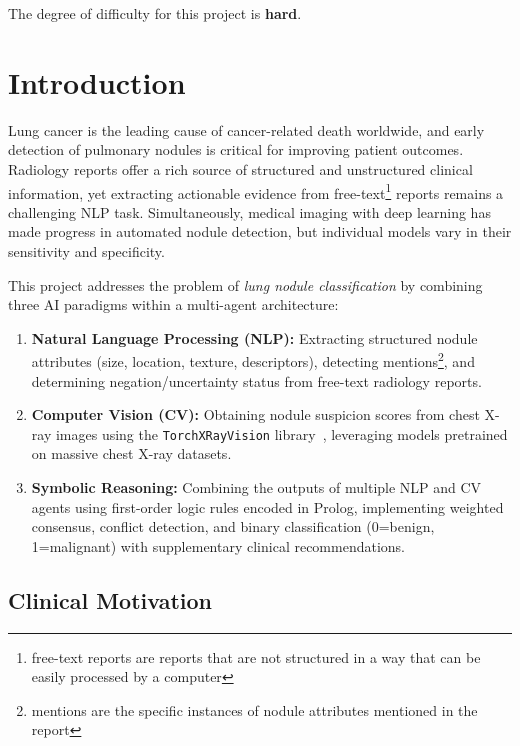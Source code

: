 \documentclass[12pt]{article}
\begin{document}
The degree of difficulty for this project is \textbf{hard}.

\pagebreak

\section{Introduction}
\label{sec:intro}

Lung cancer is the leading cause of cancer-related death worldwide, and early detection of pulmonary nodules is critical for improving patient outcomes. Radiology reports offer a rich source of structured and unstructured clinical information, yet extracting actionable evidence from free-text\footnote{free-text reports are reports that are not structured in a way that can be easily processed by a computer} reports remains a challenging NLP task. Simultaneously, medical imaging with deep learning has made progress in automated nodule detection, but individual models vary in their sensitivity and specificity.

This project addresses the problem of \emph{lung nodule classification} by combining three AI paradigms within a multi-agent architecture:

\begin{enumerate}
    \item \textbf{Natural Language Processing (NLP):} Extracting structured nodule attributes (size, location, texture, descriptors), detecting mentions\footnote{mentions are the specific instances of nodule attributes mentioned in the report}, and determining negation/uncertainty status from free-text radiology reports.
    \item \textbf{Computer Vision (CV):} Obtaining nodule suspicion scores from chest X-ray images using the \texttt{TorchXRayVision} library~\cite{cohen2022torchxrayvision}, leveraging models pretrained on massive chest X-ray datasets.
    \item \textbf{Symbolic Reasoning:} Combining the outputs of multiple NLP and CV agents using first-order logic rules encoded in Prolog, implementing weighted consensus, conflict detection, and binary classification (0=benign, 1=malignant) with supplementary clinical recommendations.
\end{enumerate}

\subsection{Clinical Motivation}
\label{subsec:clinical-motivation}
\end{document}

